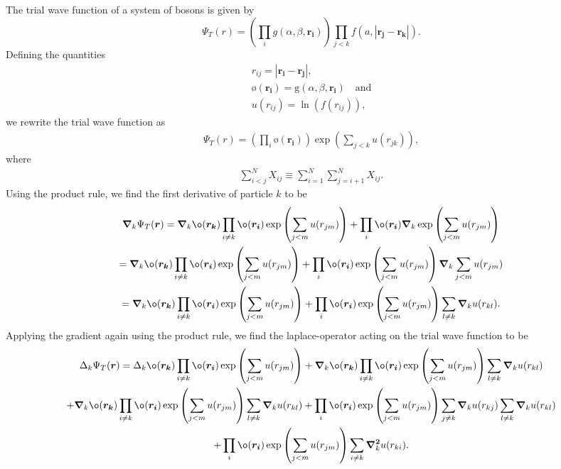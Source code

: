 The trial wave function of a system of bosons is given by
\begin{equation}
	\label{eq:trial wave function with two-body potential}
	\Psi_T(r) = \left( \prod_{i}^{}g(\alpha ,\beta ,\boldsymbol{r_i})\right) \prod_{j<k}^{} f(a,|\boldsymbol{r_j-r_k}|).
\end{equation}
Defining the quantities
\begin{equation}
	\label{eq:definitions}
	\begin{gathered}
		r _{ij} = |\boldsymbol{r_i-r_j}|,\\
		ø(\boldsymbol{r_i})=\text{g}(\alpha ,\beta ,\boldsymbol{r_i})\quad \text{and}\\
		u(r _{ij})= \ln(f(r _{ij})),
	\end{gathered}
\end{equation}
we rewrite the trial wave function as
\begin{gather*}
	\Psi_T(r) = \left( \prod_{i}^{}ø(\boldsymbol{r_i})\right) \exp\left(\sum_{j<k}^{} u(r _{jk})\right),
\end{gather*}
where
\begin{gather*}
	\sum_{i<j}^{N} X _{ij}\equiv \sum_{i=1}^{N} \sum_{j=i+1}^{N} X _{ij}.
\end{gather*}
Using the product rule, we find the first derivative of particle $k$ to be
\begin{gather*}
	\grad _{k} \Psi _{T}(\boldsymbol{r}) = \grad _{k}ø(\boldsymbol{r_k})\prod_{i\neq k}^{}ø(\boldsymbol{r_i})\exp\left(\sum_{j<m}^{} u(r _{jm})\right) + \prod_{i}^{}ø(\boldsymbol{r_i})\grad _k\exp\left(\sum_{j<m}^{} u(r _{jm})\right)\\
	= \grad _{k}ø(\boldsymbol{r_k})\prod_{i\neq k}^{}ø(\boldsymbol{r_i})\exp\left(\sum_{j<m}^{} u(r _{jm})\right) + \prod_{i}^{}ø(\boldsymbol{r_i})\exp\left(\sum_{j<m}^{} u(r _{jm})\right)\grad_k \sum_{j<m}^{} u(r _{jm})\\
	= \grad _{k}ø(\boldsymbol{r_k})\prod_{i\neq k}^{}ø(\boldsymbol{r_i})\exp\left(\sum_{j<m}^{} u(r _{jm})\right) + \prod_{i}^{}ø(\boldsymbol{r_i})\exp\left(\sum_{j<m}^{} u(r _{jm})\right) \sum_{l \neq  k} \boldsymbol{\nabla} _ku(r _{kl}).
\end{gather*}
Applying the gradient again using the product rule, we find the laplace-operator acting on the trial wave function to be
\begin{gather*}
	\Delta _{k} \Psi _{T}(\boldsymbol{r}) = \Delta _{k}ø(\boldsymbol{r_k})\prod_{i\neq k}^{}ø(\boldsymbol{r_i})
	\exp\left(\sum_{j<m}^{} u(r _{jm})\right) + \grad _{k}ø(\boldsymbol{r_k})\prod_{i\neq k}^{}ø(\boldsymbol{r_i})\exp\left(\sum_{j<m}^{} u(r _{jm})\right) \sum_{l \neq  k} \boldsymbol{\nabla} _ku(r _{kl})\\
	+\boldsymbol{ \nabla }_kø(\boldsymbol{r_k}) \prod_{i \neq k}^{} ø(\boldsymbol{r_i})
	\exp\left(\sum_{j<m}^{} u(r _{jm})\right) \sum_{l \neq  k} \boldsymbol{\nabla} _ku(r _{kl}) + \prod_{i}^{}
	ø(\boldsymbol{r_i}) \exp\left(\sum_{j<m}^{} u(r _{jm})\right) \sum_{j \neq k}^{} \boldsymbol{\nabla }_ku(r _{kj})\sum_{l \neq k}^{} \boldsymbol{\nabla }_ku(r _{kl}) \\
	+\prod_{i}^{} ø(\boldsymbol{r_i})\exp\left(\sum_{j<m}^{} u(r _{jm}	)\right)
	\sum_{i \neq k} \boldsymbol{\nabla ^2} _ku(r _{ki}).
\end{gather*}
